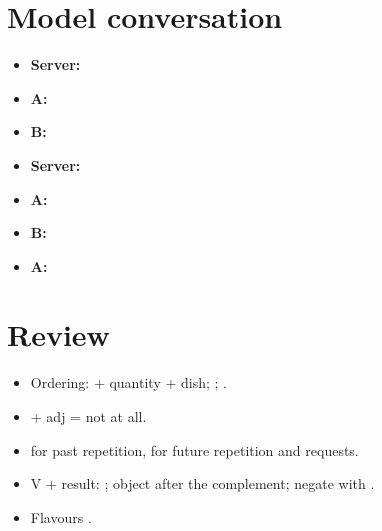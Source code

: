 \section{Model conversation}

\begin{itemize}
  \item \textbf{Server:} 
  \item \textbf{A:} 
  \item \textbf{B:} 
  \item \textbf{Server:} 
  \item \textbf{A:} 
  \item \textbf{B:} 
  \item \textbf{A:} 
\end{itemize}

\section*{Review}
\begin{itemize}
  \item Ordering:  + quantity + dish; ; .
  \item {} + adj = not at all.
  \item {} for past repetition,  for future repetition and requests.
  \item V + result: ; object after the
        complement; negate with .
  \item Flavours .
\end{itemize}
